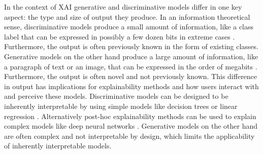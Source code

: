 In the context of \ac{XAI} generative and discriminative models differ in one key aspect: the type and size of output they produce. In an information theoretical sense, discriminative models produce a small amount of information, like a class label that can be expressed in possibly a few dozen bits in extreme cases \parencite{Schneider2024}. Furthermore, the output is often previously known in the form of existing classes. Generative models on the other hand produce a large amount of information, like a paragraph of text or an image, that can be expressed in the order of megabits \parencite{Schneider2024}. Furthermore, the output is often novel and not previously known. This difference in output has implications for explainability methods and how users interact with and perceive these models. Discriminative models can be designed to be inherently interpretable by using simple models like decision trees or linear regression \parencite{Rudin2019}. Alternatively post-hoc explainability methods can be used to explain complex models like deep neural networks \parencite{Ribeiro2016, Lundberg2017}. Generative models on the other hand are often complex and not interpretable by design, which limits the applicability of inherently interpretable models.







